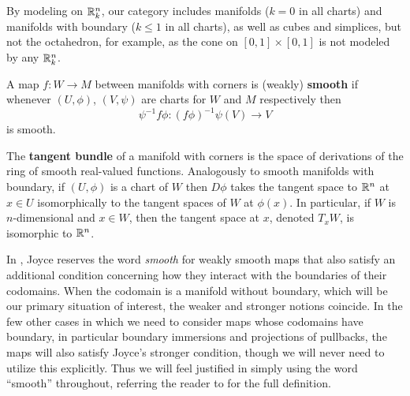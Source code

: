 By modeling on $\mathbb{R}^n_k$, our category includes manifolds ($k = 0$ in all charts) and manifolds with boundary ($k \leq 1$ in all charts), as well as cubes and simplices, but not the octahedron, for example, as the cone on $[0,1] \times [0,1]$ is not modeled by any $\mathbb{R}^n_k$.

\begin{definition}
	A map $f \colon W \to M$ between manifolds with corners is {(weakly) \bf smooth} if whenever $(U,\phi)$, $(V,\psi)$ are charts for $W$ and $M$ respectively then
	$$\psi^{-1}f \phi \colon (f\phi)^{-1}\psi(V) \to V$$
	is smooth.

	The \textbf{tangent bundle} of a manifold with corners is the space of derivations of the ring of smooth real-valued functions.
	Analogously to smooth manifolds with boundary, if $(U,\phi)$ is a chart of $W$ then $D\phi$ takes the tangent space to $\mathbb{R}^n$ at $x \in U$ isomorphically to the tangent spaces of $W$ at $\phi(x)$.
	In particular, if $W$ is $n$-dimensional and $x \in W$, then the tangent space at $x$, denoted $T_xW$, is isomorphic to $\mathbb{R}^n$.
\end{definition}

\begin{remark}\label{R: weakly smooth}
	In \cite{Joy12}, Joyce reserves the word \textit{smooth} for weakly smooth maps that also satisfy an additional condition concerning how they interact with the boundaries of their codomains.
	When the codomain is a manifold without boundary, which will be our primary situation of interest, the weaker and stronger notions coincide.
	In the few other cases in which we need to consider maps whose codomains have boundary, in particular boundary immersions and projections of pullbacks, the maps will also satisfy Joyce's stronger condition, though we will never need to utilize this explicitly.
	Thus we will feel justified in simply using the word ``smooth'' throughout, referring the reader to \cite[Definition 3.1]{Joy12} for the full definition.
\end{remark}

